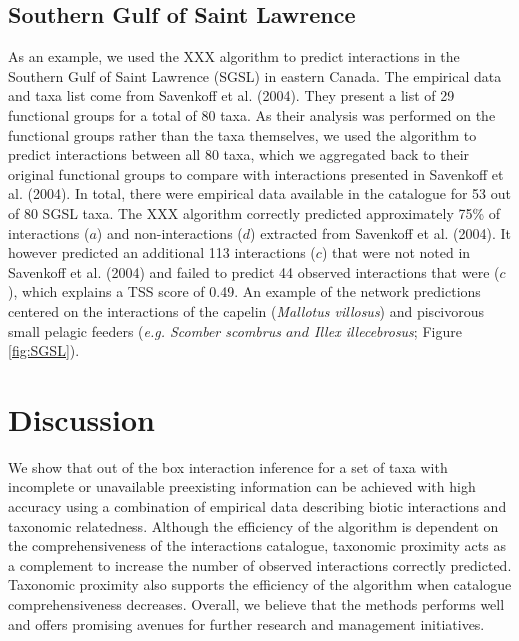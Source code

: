 \documentclass[letterpaper]{article}
\begin{document}
    \subsection{Southern Gulf of Saint Lawrence}
As an example, we used the XXX algorithm to predict interactions in the Southern Gulf of Saint Lawrence (SGSL) in eastern Canada. The empirical data and taxa list come from Savenkoff et al. (2004). They present a list of 29 functional groups for a total of 80 taxa. As their analysis was performed on the functional groups rather than the taxa themselves, we used the algorithm to predict interactions between all 80 taxa, which we aggregated back to their original functional groups to compare with interactions presented in Savenkoff et al. (2004). In total, there were empirical data available in the catalogue for 53 out of 80 SGSL taxa. The XXX algorithm correctly predicted approximately 75\% of interactions ($a$) and non-interactions ($d$) extracted from Savenkoff et al. (2004). It however predicted an additional 113 interactions ($c$) that were not noted in Savenkoff et al. (2004) and failed to predict 44 observed interactions that were ($c$), which explains a TSS score of 0.49. An example of the network predictions centered on the interactions of the capelin (\textit{Mallotus villosus}) and piscivorous small pelagic feeders (\textit{e.g. Scomber scombrus $and$ Illex illecebrosus}; Figure \ref{fig:SGSL}).



\section{Discussion}
We show that out of the box interaction inference for a set of taxa with incomplete or unavailable preexisting information can be achieved with high accuracy using a combination of empirical data describing biotic interactions and taxonomic relatedness. Although the efficiency of the algorithm is dependent on the comprehensiveness of the interactions catalogue, taxonomic proximity acts as a complement to increase the number of observed interactions correctly predicted. Taxonomic proximity also supports the efficiency of the algorithm when catalogue comprehensiveness decreases. Overall, we believe that the methods performs well and offers promising avenues for further research and management initiatives.
\end{document}
